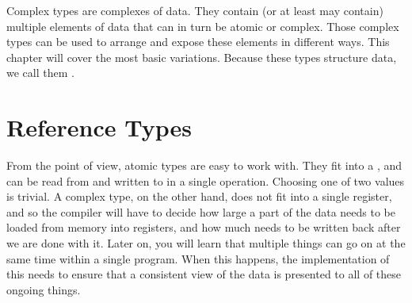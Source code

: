 Complex types are complexes of data. They contain (or at least may contain) multiple elements of data that can in turn be atomic or complex. Those complex types can be used to arrange and expose these elements in different ways. This chapter will cover the most basic variations. Because these types structure data, we call them .

\section{Reference Types}

From the  point of view, atomic types are easy to work with. They fit into a , and can be read from and written to  in a single operation. Choosing one of two values is trivial. A complex type, on the other hand, does not fit into a single register, and so the compiler will have to decide how large a part of the data needs to be loaded from memory into registers, and how much needs to be written back after we are done with it. Later on, you will learn that multiple things can go on at the same time within a single program. When this happens, the implementation of this needs to ensure that a consistent view of the data is presented to all of these ongoing things.

